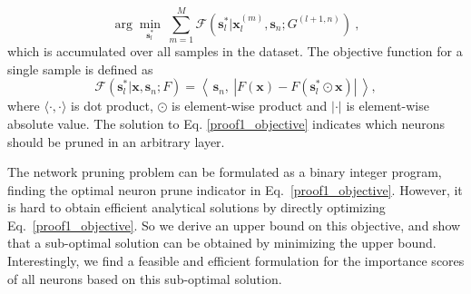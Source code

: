 \documentclass[10pt,twocolumn,letterpaper]{article}
\def\mb{\mathbf}
\begin{document}
\begin{equation}
\label{proof1_objective}
\arg\min_{\mb s^*_l}\ \sum_{m=1}^M \mathcal{F}(\mb s^*_l|\mb x^{(m)}_l,\mb s_n; G^{(l+1,n)})~,
\end{equation}
which is accumulated over all samples in the dataset. The objective function for a single sample is defined as
\begin{equation}\label{proof1_objective2}
\mathcal{F}(\mb s^*_l|\mb x,\mb s_n; F)=\left\langle\ \mb s_n,\ |F(\mb x)-F(\mb s^*_l \odot \mb x)|\ \right\rangle,
\end{equation}
where $\langle\cdot,\cdot\rangle$ is dot product, $\odot$ is element-wise product and $|\cdot|$ is element-wise absolute value. The solution to Eq. \ref{proof1_objective} indicates which neurons should be pruned in an arbitrary layer.

The network pruning problem can be formulated as a binary integer program, finding the optimal neuron prune indicator in Eq.~\ref{proof1_objective}. However, it is hard to obtain efficient analytical solutions by directly optimizing Eq.~\ref{proof1_objective}. So we derive an upper bound on this objective, and show that a sub-optimal solution can be obtained by minimizing the upper bound. Interestingly, we find a feasible and efficient formulation for the importance scores of all neurons based on this sub-optimal solution. 
\end{document}
